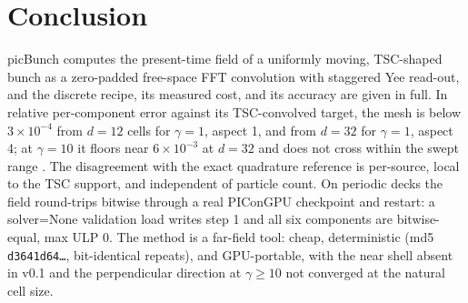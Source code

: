 \section{Conclusion}
\label{sec:conclusion}

picBunch computes the present-time field of a uniformly moving, TSC-shaped
bunch as a zero-padded free-space FFT convolution with staggered Yee read-out,
and the discrete recipe, its measured cost, and its accuracy are given in full.
In relative per-component error against its TSC-convolved target, the mesh is
below $3\times10^{-4}$ from $d=12$ cells for $\gamma=1$, aspect 1, and from
$d=32$ for $\gamma=1$, aspect 4; at $\gamma=10$ it floors near
$6\times10^{-3}$ at $d=32$ and does not cross within the swept range
\citep{W4b}. The disagreement with the exact quadrature reference is per-source,
local to the TSC support, and independent of particle count. On periodic
decks the field round-trips bitwise through a real PIConGPU checkpoint and
restart: a solver=None validation load writes step 1 and all six components
are bitwise-equal, max ULP 0. The
method is a far-field tool: cheap, deterministic (md5 \texttt{d3641d64\ldots},
bit-identical repeats), and GPU-portable, with the near shell absent in v0.1
and the perpendicular direction at $\gamma\ge10$ not converged at the natural
cell size.
